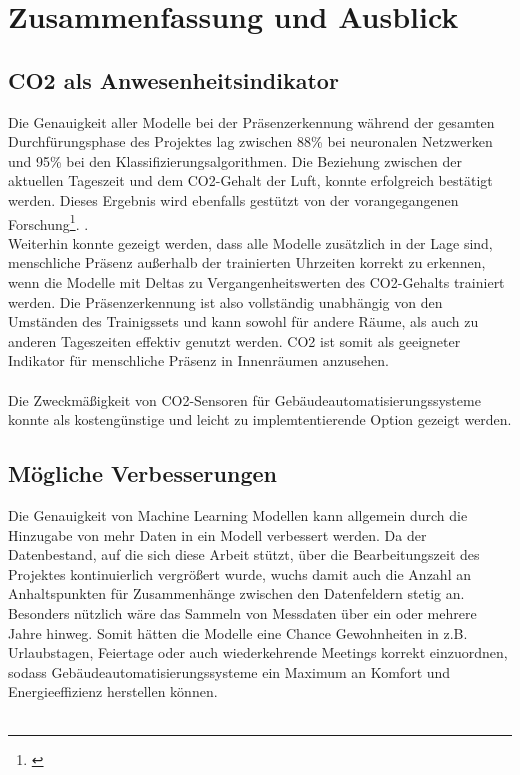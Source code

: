 \clearpage
\chapter{\textbf{Zusammenfassung und Ausblick}}\label{zusammenfassung}

\section{CO2 als Anwesenheitsindikator}
Die Genauigkeit aller Modelle bei der Präsenzerkennung während der gesamten Durchfürungsphase des Projektes 
lag zwischen 88\% bei neuronalen Netzwerken und 95\% bei den Klassifizierungsalgorithmen. 
Die Beziehung zwischen der aktuellen Tageszeit und dem CO2-Gehalt der Luft, konnte erfolgreich bestätigt 
werden. Dieses Ergebnis wird ebenfalls gestützt von der vorangegangenen Forschung\footnote[1]{\cite{IPPR}}.
.\\
Weiterhin konnte gezeigt werden, dass alle Modelle zusätzlich in der Lage sind, menschliche Präsenz außerhalb
der trainierten Uhrzeiten korrekt zu erkennen, wenn die Modelle mit Deltas zu Vergangenheitswerten des 
CO2-Gehalts trainiert werden. Die Präsenzerkennung ist also vollständig unabhängig von den Umständen des
Trainigssets und kann sowohl für andere Räume, als auch zu anderen Tageszeiten effektiv genutzt werden. 
CO2 ist somit als geeigneter Indikator für menschliche Präsenz in Innenräumen anzusehen.\\\\
Die Zweckmäßigkeit von CO2-Sensoren für Gebäudeautomatisierungssysteme konnte als kostengünstige und leicht 
zu implemtentierende Option gezeigt werden.

\section{Mögliche Verbesserungen}
Die Genauigkeit von Machine Learning Modellen kann allgemein durch die Hinzugabe von mehr Daten in ein Modell 
verbessert werden. 
Da der Datenbestand, auf die sich diese Arbeit stützt, über die Bearbeitungszeit des Projektes 
kontinuierlich vergrößert wurde, wuchs damit auch die Anzahl an Anhaltspunkten für Zusammenhänge zwischen den 
Datenfeldern stetig an. Besonders nützlich wäre das Sammeln von Messdaten über ein oder mehrere Jahre hinweg.
Somit hätten die Modelle eine Chance Gewohnheiten in z.B. Urlaubstagen, Feiertage oder auch wiederkehrende
Meetings korrekt einzuordnen, sodass Gebäudeautomatisierungssysteme ein Maximum an Komfort und Energieeffizienz
herstellen können.\\\\

